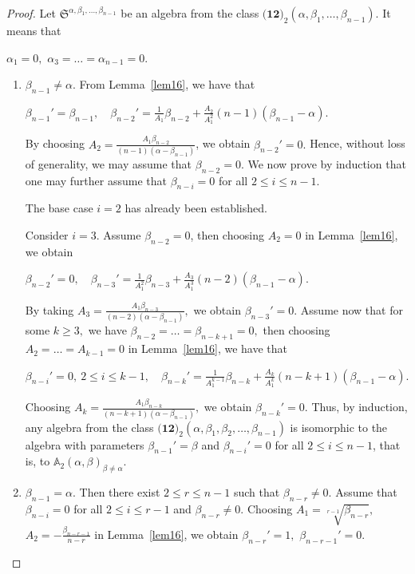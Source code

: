 \documentclass{jonasart}
\begin{document}
	\begin{proof}
		Let $\mathfrak{S}^{\alpha, \beta_{1},\dots, \beta_{n-1}}$ be an algebra from the class $\textbf{(12)}_2 (\alpha, \beta_{1},\dots,\beta_{n-1})$. It means that
		\begin{center}
			$\alpha_1 =0,$ $\alpha_3 =\dots =\alpha_{n-1}=0.$
		\end{center}

		\begin{enumerate}
			\item[\textbf{Case 1:}] $\beta_{n-1} \neq \alpha.$ From Lemma~\ref{lem16}, we have that
			\begin{center}
				$\beta_{n-1}'=\beta_{n-1}, \quad \beta_{n-2}'=\frac{1}{A_1} \beta_{n-2} +\frac{A_2}{A_1^2} (n-1) (\beta_{n-1}-\alpha).$
			\end{center}
			By choosing $A_2 = \frac{A_1 \beta_{n-2}}{(n-1)(\alpha-\beta_{n-1})}$, we obtain $\beta_{n-2}'=0.$ Hence, without loss of generality, we may assume that $\beta_{n-2}=0.$ We now prove by induction that one may further assume that $\beta_{n-i} = 0$ for all $2 \le i \le n-1$.

			The base case $i=2$ has already been established.

			Consider $i=3$. Assume $\beta_{n-2}=0$, then choosing $A_2 = 0$ in Lemma~\ref{lem16}, we obtain
			\begin{center}
				$\beta_{n-2}'=0, \quad \beta_{n-3}'=\frac{1}{A_1^2} \beta_{n-3} +\frac{A_3}{A_1^3} (n-2) (\beta_{n-1}-\alpha).$
			\end{center}
			By taking $A_3 =\frac{A_1 \beta_{n-3}}{(n-2)(\alpha-\beta_{n-1})},$ we obtain $\beta_{n-3}'=0.$
			Assume now that for some $k \ge 3,$ we have $\beta_{n-2}= \dots= \beta_{n-k+1}=0,$ then choosing $A_2 =\dots=A_{k-1}=0$
			in Lemma~\ref{lem16}, we have that
			\begin{center}
				$\beta_{n-i}'=0, \ 2 \leq i \leq k-1, \quad \beta_{n-k}'=\frac{1}{A_1^{k-1}} \beta_{n-k} +\frac{A_k}{A_1^k} (n-k+1) (\beta_{n-1}-\alpha).$
			\end{center}
			Choosing $A_k =\frac{A_1 \beta_{n-k}}{(n-k+1)(\alpha-\beta_{n-1})},$ we obtain $\beta_{n-k}'=0.$
			Thus, by induction, any algebra from the class $\textbf{(12)}_2 (\alpha, \beta_{1},\beta_{2},\dots,\beta_{n-1})$ is isomorphic to the algebra with parameters $\beta_{n-1}' = \beta$ and $\beta_{n-i}' = 0$ for all $2 \le i \le n-1$, that is, to $\mathbb{A}_2 (\alpha,\beta)_{\beta \neq \alpha}$.

			\item[\textbf{Case 2:}] $\beta_{n-1} = \alpha.$ Then there exist $2 \le r \le {n-1}$ such that $\beta_{n-r} \neq 0.$ Assume that
			$\beta_{n-i}=0$ for all $2\leq i\leq r-1$ and $\beta_{n-r} \neq 0.$ Choosing $A_1 = \sqrt[r-1]{\beta_{n-r}},$ $A_2 = -\frac{\beta_{n-r-1}}{n-r}$ in Lemma~\ref{lem16}, we obtain $\beta_{n-r}'=1,$ $\beta_{n-r-1}'=0.$


\end{enumerate}
\end{proof}
\end{document}

